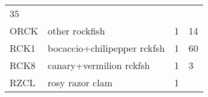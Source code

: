 \documentclass[]{article}
\begin{document}
\begin{longtable}[c]{@{}llll@{}}
\begin{minipage}[t]{0.23\columnwidth}
35
\end{minipage}
\\\addlinespace
\begin{minipage}[t]{0.08\columnwidth}\raggedright
ORCK
\end{minipage} & \begin{minipage}[t]{0.36\columnwidth}\raggedright
other rockfish
\end{minipage} & \begin{minipage}[t]{0.21\columnwidth}\raggedright
1
\end{minipage} & \begin{minipage}[t]{0.23\columnwidth}\raggedright
14
\end{minipage}
\\\addlinespace
\begin{minipage}[t]{0.08\columnwidth}\raggedright
RCK1
\end{minipage} & \begin{minipage}[t]{0.36\columnwidth}\raggedright
bocaccio+chilipepper rckfsh
\end{minipage} & \begin{minipage}[t]{0.21\columnwidth}\raggedright
1
\end{minipage} & \begin{minipage}[t]{0.23\columnwidth}\raggedright
60
\end{minipage}
\\\addlinespace
\begin{minipage}[t]{0.08\columnwidth}\raggedright
RCK8
\end{minipage} & \begin{minipage}[t]{0.36\columnwidth}\raggedright
canary+vermilion rckfsh
\end{minipage} & \begin{minipage}[t]{0.21\columnwidth}\raggedright
1
\end{minipage} & \begin{minipage}[t]{0.23\columnwidth}\raggedright
3
\end{minipage}
\\\addlinespace
\begin{minipage}[t]{0.08\columnwidth}\raggedright
RZCL
\end{minipage} & \begin{minipage}[t]{0.36\columnwidth}\raggedright
rosy razor clam
\end{minipage} & \begin{minipage}[t]{0.21\columnwidth}\raggedright
1
\end{minipage} & \begin{minipage}[t]{0.23\columnwidth}\raggedright

\end{minipage}
\end{longtable}
\end{document}
